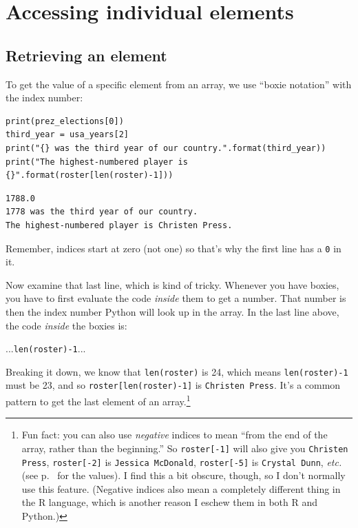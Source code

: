 \section{Accessing individual elements}

\subsection{Retrieving an element}

To get the value of a specific element from an array, we use ``boxie notation''
with the index number:

\begin{Verbatim}[fontsize=\small,samepage=true,frame=single,framesep=3mm]
print(prez_elections[0])
third_year = usa_years[2]
print("{} was the third year of our country.".format(third_year))
print("The highest-numbered player is {}".format(roster[len(roster)-1]))
\end{Verbatim}

\begin{Verbatim}[fontsize=\small,samepage=true,frame=leftline,framesep=5mm,framerule=1mm]
1788.0
1778 was the third year of our country.
The highest-numbered player is Christen Press.
\end{Verbatim}

Remember, indices start at zero (not one) so that's why the first line has a
\texttt{0} in it.

Now examine that last line, which is kind of tricky. Whenever you have boxies,
you have to first evaluate the code \textit{inside} them to get a number. That
number is then the index number Python will look up in the array. In the last
line above, the code \textit{inside} the boxies is:

\quad\quad\quad   ...\texttt{len(roster)-1}...

Breaking it down, we know that \texttt{len(roster)} is 24, which means
\texttt{len(roster)-1} must be 23, and so \texttt{roster[len(roster)-1]} is
\texttt{Christen Press}. It's a common pattern to get the last element of an
array.\footnote{Fun fact: you can also use \textit{negative} indices to mean
``from the end of the array, rather than the beginning.'' So
\texttt{roster[-1]} will also give you \texttt{Christen Press},
\texttt{roster[-2]} is \texttt{Jessica McDonald},
\texttt{roster[-5]} is \texttt{Crystal Dunn}, \textit{etc.} (see
p.~\pageref{rosterNames} for the values). I find this a bit obscure, though, so
I don't normally use this feature. (Negative indices also mean a completely
different thing in the R language, which is another reason I eschew them in
both R and Python.)}

